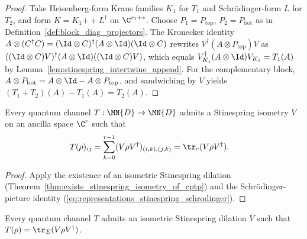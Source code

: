 \begin{proof}\leanok
    Take Heisenberg-form Kraus families $K_1$ for $T_1$ and
    Schr\"odinger-form $L$ for $T_2$, and form
    $K=K_1\mathbin{+\!+}L^\dagger$ on $\C^{r_1+s}$. Choose
    $P_1=P_{\mathrm{top}}$, $P_2=P_{\mathrm{bot}}$ as in
    Definition~\ref{def:block_diag_projectors}. The Kronecker identity
    $A\otimes(C^\dagger C)
    =(\Id\otimes C)^\dagger(A\otimes\Id)(\Id\otimes C)$ rewrites
    $V^\dagger(A\otimes P_{\mathrm{top}})V$ as
    $((\Id\otimes C)V)^\dagger(A\otimes\Id)((\Id\otimes C)V)$,
    which equals $V_{K_1}^\dagger(A\otimes\Id)V_{K_1}=T_1(A)$ by
    Lemma~\ref{lem:stinespring_intertwine_append}. For the complementary
    block, $A\otimes P_{\mathrm{bot}}
    =A\otimes\Id-A\otimes P_{\mathrm{top}}$, and sandwiching by $V$ yields
    $(T_1+T_2)(A)-T_1(A)=T_2(A)$.
\end{proof}

\begin{theorem}
    \label{thm:channel_exists_stinespring_open_system}
    \leanok
    Every quantum channel $T:\MN{D}\to\MN{D}$ admits a Stinespring
    isometry $V$ on an ancilla space $\C^r$ such that
    \begin{align}
        T(\rho)_{ij}
        &=\sum_{k=0}^{r-1}(V\rho V^\dagger)_{(i,k),(j,k)}
          =\tr_r(V\rho V^\dagger).
        \label{eq:representations_open_system}
    \end{align}
\end{theorem}

\begin{proof}\leanok
    Apply the existence of an isometric Stinespring dilation
    (Theorem~\ref{thm:exists_stinespring_isometry_of_cptp}) and the
    Schr\"odinger-picture identity
    (\ref{eq:representations_stinespring_schrodinger}).
\end{proof}

\begin{theorem}
    \label{thm:channel_exists_stinespring_open_system_traceRight}
    \leanok
    Every quantum channel $T$ admits an isometric Stinespring dilation
    $V$ such that $T(\rho)=\tr_E(V\rho V^\dagger)$.
\end{theorem}

